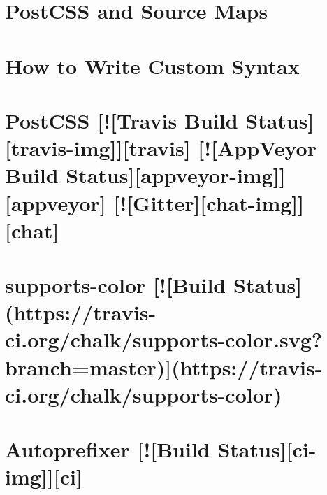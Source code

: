 \documentclass[twoside]{book}
\newcommand{\+}{\discretionary{\mbox{\scriptsize$\hookleftarrow$}}{}{}}
\begin{document}
\chapter{Post\+C\+SS and Source Maps}
\label{md__c_1_workspace_demo_src_main_script_node_modules_autoprefixer_node_modules_postcss_docs_source-maps}

\chapter{How to Write Custom Syntax}
\label{md__c_1_workspace_demo_src_main_script_node_modules_autoprefixer_node_modules_postcss_docs_syntax}

\chapter{Post\+C\+SS \mbox{[}!\mbox{[}Travis Build Status\mbox{]}\mbox{[}travis-\/img\mbox{]}\mbox{]}\mbox{[}travis\mbox{]} \mbox{[}!\mbox{[}App\+Veyor Build Status\mbox{]}\mbox{[}appveyor-\/img\mbox{]}\mbox{]}\mbox{[}appveyor\mbox{]} \mbox{[}!\mbox{[}Gitter\mbox{]}\mbox{[}chat-\/img\mbox{]}\mbox{]}\mbox{[}chat\mbox{]}}
\label{md__c_1_workspace_demo_src_main_script_node_modules_autoprefixer_node_modules_postcss__r_e_a_d_m_e}

\chapter{supports-\/color \mbox{[}!\mbox{[}Build Status\mbox{]}(https\+://travis-\/ci.org/chalk/supports-\/color.svg?branch=master)\mbox{]}(https\+://travis-\/ci.org/chalk/supports-\/color)}
\label{md__c_1_workspace_demo_src_main_script_node_modules_autoprefixer_node_modules_supports-color_readme}

\chapter{Autoprefixer \mbox{[}!\mbox{[}Build Status\mbox{]}\mbox{[}ci-\/img\mbox{]}\mbox{]}\mbox{[}ci\mbox{]}}
\label{md__c_1_workspace_demo_src_main_script_node_modules_autoprefixer__r_e_a_d_m_e}

\end{document}
